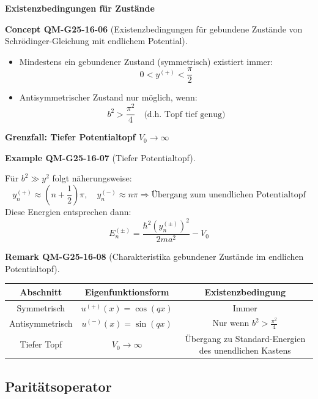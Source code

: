 \documentclass[10pt, letterpaper]{article}
\newcommand{\CustomHeading}[3]{%
  \par\medskip\noindent%
  \textbf{#1 #2} \textnormal{(#3)}.\enskip%
}
\newenvironment{REM}[2]{\begin{unitbox}\CustomHeading{Remark}{#1}{#2}}{\end{unitbox}}
\newenvironment{EXA}[2]{\begin{unitbox}\CustomHeading{Example}{#1}{#2}}{\end{unitbox}}
\newenvironment{CONC}[2]{\begin{unitbox}\CustomHeading{Concept}{#1}{#2}}{\end{unitbox}}
\begin{document}
\textbf{Existenzbedingungen für Zustände}

\begin{CONC}{QM-G25-16-06}{Existenzbedingungen für gebundene Zustände von Schrödinger-Gleichung mit endlichem Potential}
\begin{itemize}
\item Mindestens ein gebundener Zustand (symmetrisch) existiert immer:
  \[
  0 < y^{(+)} < \frac{\pi}{2}
  \]
\item Antisymmetrischer Zustand nur möglich, wenn:
  \[
  b^2 > \frac{\pi^2}{4}
  \quad \text{(d.h. Topf tief genug)}
  \]
\end{itemize}
\end{CONC}



\textbf{Grenzfall: Tiefer Potentialtopf $V_0 \rightarrow \infty$}


\begin{EXA}{QM-G25-16-07}{Tiefer Potentialtopf}
Für \( b^2 \gg y^2 \) folgt näherungsweise:
\[
y_n^{(+)} \approx \left(n + \frac{1}{2}\right)\pi, \quad
y_n^{(-)} \approx n \pi
\Rightarrow \text{Übergang zum unendlichen Potentialtopf}
\]
Diese Energien entsprechen dann:
\[
E_n^{(\pm)} = \frac{\hbar^2 (y_n^{(\pm)})^2}{2ma^2} - V_0
\]
\end{EXA}




\begin{REM}{QM-G25-16-08}{Charakteristika gebundener Zustände im endlichen Potentialtopf}
\begin{tabular}{|c|c|c|}
\hline
\textbf{Abschnitt} & \textbf{Eigenfunktionsform} & \textbf{Existenzbedingung} \\
\hline
Symmetrisch & $u^{(+)}(x) = \cos(qx)$ & Immer \\
\hline
Antisymmetrisch & $u^{(-)}(x) = \sin(qx)$ & Nur wenn $b^2 > \frac{\pi^2}{4}$ \\
\hline
Tiefer Topf & $V_0 \to \infty$ & Übergang zu Standard-Energien des unendlichen Kastens \\
\hline
\end{tabular}
\end{REM}








\pagebreak



\subsection{Paritätsoperator}
\end{document}
